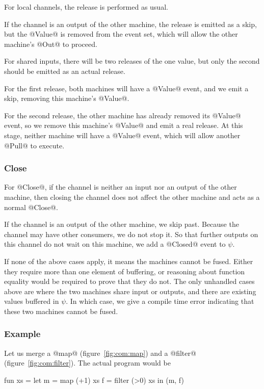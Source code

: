 For local channels, the release is performed as usual.

If the channel is an output of the other machine, the release is emitted as a skip, but the @Value@ is removed from the event set, which will allow the other machine's @Out@ to proceed.

For shared inputs, there will be two releases of the one value, but only the second should be emitted as an actual release.

For the first release, both machines will have a @Value@ event, and we emit a skip, removing this machine's @Value@.

For the second release, the other machine has already removed its @Value@ event, so we remove this machine's @Value@ and emit a real release.
At this stage, neither machine will have a @Value@ event, which will allow another @Pull@ to execute.

\subsubsection{Close}
For @Close@, if the channel is neither an input nor an output of the other machine, then closing the channel does not affect the other machine and acts as a normal @Close@.

If the channel is an output of the other machine, we skip past.
Because the channel may have other consumers, we do not stop it.
So that further outputs on this channel do not wait on this machine, we add a @Closed@ event to $\psi$.



If none of the above cases apply, it means the machines cannot be fused.
Either they require more than one element of buffering, or reasoning about function equality would be required to prove that they do not.
The only unhandled cases above are where the two machines share input or outputs, and there are existing values buffered in $\psi$.
In which case, we give a compile time error indicating that these two machines cannot be fused.

\subsubsection{Example}
Let us merge a @map@ (figure~\ref{fig:com:map}) and a @filter@ (figure~\ref{fig:com:filter}).
The actual program would be
\begin{code}
fun xs
 = let m  = map    (+1) xs
       f  = filter (>0) xs
   in (m, f)
\end{code}

